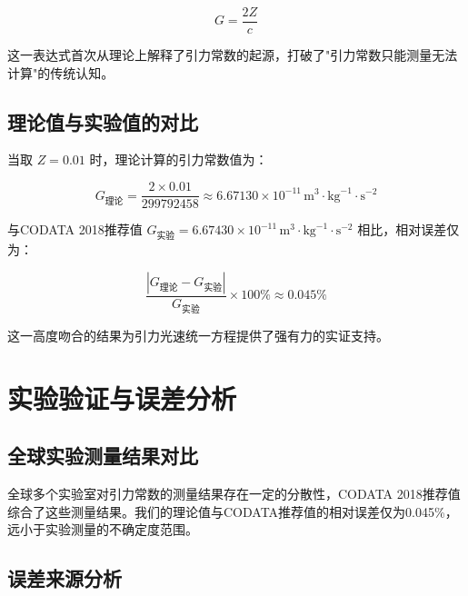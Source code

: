 \documentclass[12pt,a4paper]{article}
\begin{document}
\begin{equation}
G = \frac{2Z}{c}

\end{equation}

这一表达式首次从理论上解释了引力常数的起源，打破了"引力常数只能测量无法计算"的传统认知。

\subsection{理论值与实验值的对比}
\label{subsection:theory_experiment_comparison}

当取 $Z = 0.01$ 时，理论计算的引力常数值为：

\begin{equation}
G_{\text{理论}} = \frac{2 \times 0.01}{299792458} \approx 6.67130 \times 10^{-11} \, \text{m}^3 \cdot \text{kg}^{-1} \cdot \text{s}^{-2}

\end{equation}

与CODATA 2018推荐值 $G_{\text{实验}} = 6.67430 \times 10^{-11} \, \text{m}^3 \cdot \text{kg}^{-1} \cdot \text{s}^{-2}$ 相比，相对误差仅为：

\begin{equation}
\frac{|G_{\text{理论}} - G_{\text{实验}}|}{G_{\text{实验}}} \times 100\% \approx 0.045\%

\end{equation}

这一高度吻合的结果为引力光速统一方程提供了强有力的实证支持。

\section{实验验证与误差分析}
\label{section:experimental_validation}

\subsection{全球实验测量结果对比}
\label{subsection:global_experiment_comparison}

全球多个实验室对引力常数的测量结果存在一定的分散性，CODATA 2018推荐值综合了这些测量结果。我们的理论值与CODATA推荐值的相对误差仅为0.045\%，远小于实验测量的不确定度范围。

\subsection{误差来源分析}
\label{subsection:error_source_analysis}
\end{document}
